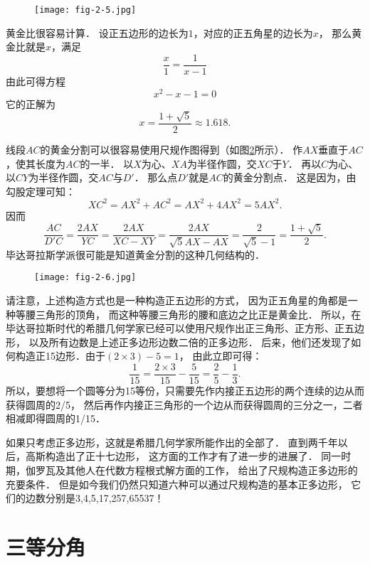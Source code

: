 \documentclass[cn,fancy,blue,11pt]{elegantbook}
\begin{document}
\begin{figure}[htbp]
	\centering
	\texttt{[image: fig-2-5.jpg]}
	\caption{\label{fig:2-5}}
\end{figure}

黄金比很容易计算．
设正五边形的边长为$1$，对应的正五角星的边长为$x$，
那么黄金比就是$x$，满足
\[\frac{x}{1}=\frac{1}{x-1}\]
由此可得方程\[x^2-x-1=0\]
它的正解为
\[x=\frac{1+\sqrt{5}}{2}\approx 1.618.\]

线段$AC$的黄金分割可以很容易使用尺规作图得到（如图\ref{fig:2-6}所示）．
作$AX$垂直于$AC$，使其长度为$AC$的一半．
以$X$为心、$XA$为半径作圆，交$XC$于$Y$．
再以$C$为心、以$CY$为半径作圆，交$AC$与$D'$．
那么点$D'$就是$AC$的黄金分割点．
这是因为，由勾股定理可知：
\[XC^2=AX^2+AC^2=AX^2+4AX^2=5AX^2.\]
因而
\[\frac{AC}{D'C}=\frac{2AX}{YC}=\frac{2AX}{XC-XY}=\frac{2AX}{\sqrt{5}AX-AX}
=\frac{2}{\sqrt{5}-1}=\frac{1+\sqrt{5}}{2}.\]
毕达哥拉斯学派很可能是知道黄金分割的这种几何结构的．

\begin{figure}[htbp]
	\centering
	\texttt{[image: fig-2-6.jpg]}
	\caption{\label{fig:2-6}}
\end{figure}

请注意，上述构造方式也是一种构造正五边形的方式，
因为正五角星的角都是一种等腰三角形的顶角，
而这种等腰三角形的腰和底边之比正是黄金比．
所以，在毕达哥拉斯时代的希腊几何学家已经可以使用尺规作出正三角形、正方形、正五边形，
以及所有边数是上述正多边形边数二倍的正多边形．
后来，他们还发现了如何构造正15边形．由于$(2\times 3)-5=1$，
由此立即可得：
\[\frac{1}{15}=\frac{2\times3}{15}-\frac{5}{15}=\frac{2}{5}-\frac{1}{3}.\]
所以，要想将一个圆等分为15等份，只需要先作内接正五边形的两个连续的边从而获得圆周的2/5，
然后再作内接正三角形的一个边从而获得圆周的三分之一，二者相减即得圆周的1/15．

如果只考虑正多边形，这就是希腊几何学家所能作出的全部了．
直到两千年以后，高斯构造出了正十七边形，
这方面的工作才有了进一步的进展了．
同一时期，伽罗瓦及其他人在代数方程根式解方面的工作，
给出了尺规构造正多边形的充要条件．
但是如今我们仍然只知道六种可以通过尺规构造的基本正多边形，
它们的边数分别是3,4,5,17,257,65537！

\section{三等分角}
\end{document}
